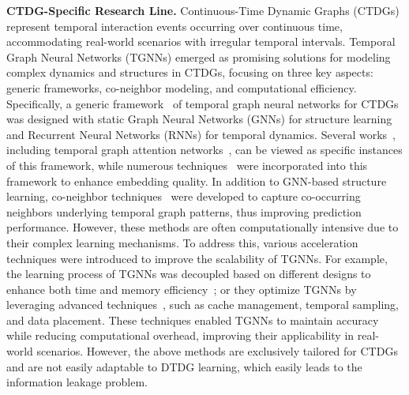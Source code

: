\noindent\textbf{CTDG-Specific Research Line.} Continuous-Time Dynamic Graphs (CTDGs) represent temporal interaction events occurring over continuous time, accommodating real-world scenarios with irregular temporal intervals. Temporal Graph Neural Networks (TGNNs) emerged as promising solutions for modeling complex dynamics and structures in CTDGs, focusing on three key aspects: generic frameworks, co-neighbor modeling, and computational efficiency. Specifically, a generic framework~\cite{tgn_icml_grl2020} of temporal graph neural networks for CTDGs was designed with static Graph Neural Networks (GNNs) for structure learning and Recurrent Neural Networks (RNNs) for temporal dynamics. Several works~\cite{DBLP:conf/kdd/KumarZL19,DBLP:conf/iclr/TrivediFBZ19,DBLP:conf/iclr/XuRKKA20,yang2021time}, including temporal graph attention networks~\cite{DBLP:conf/iclr/XuRKKA20}, can be viewed as specific instances of this framework, while numerous techniques~\cite{liu2020k,DBLP:conf/iclr/CongZKYWZTM23,DBLP:journals/pvldb/FangFGFH23,DBLP:conf/www/SureshSMN023,xu2024scalable,xu2024bootstrapping} were incorporated into this framework to enhance embedding quality. In addition to GNN-based structure learning, co-neighbor techniques~\cite{DBLP:conf/iclr/WangCLL021,souza2022provably,DBLP:conf/nips/JinLP22,luo2022neighborhood,yu2023towards,tian2023freedyg,li2024robust,cheng2024co} were developed to capture co-occurring neighbors underlying temporal graph patterns, thus improving prediction performance. However, these methods are often computationally intensive due to their complex learning mechanisms. To address this, various acceleration techniques were introduced to improve the scalability of TGNNs. For example, the learning process of TGNNs was decoupled based on different designs to enhance both time and memory efficiency~\cite{DBLP:conf/sigmod/WangLLXYWWCYSG21,TimeSGN}; or they optimize TGNNs by leveraging advanced techniques~\cite{zhou2022tgl,yang2023time,DBLP:journals/pvldb/LiSCY23,DBLP:journals/pacmmod/LiSCY23,gao2024simple}, such as cache management, temporal sampling, and data placement. These techniques enabled TGNNs to maintain accuracy while reducing computational overhead, improving their applicability in real-world scenarios. However, the above methods are exclusively tailored for CTDGs and are not easily adaptable to DTDG learning, which easily leads to the information leakage problem.




